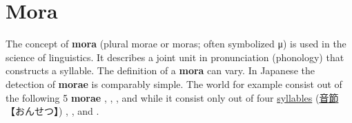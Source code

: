 \section{Mora}
\label{sec:Mora}
 
 

The concept of \textbf{mora} (plural morae or moras; often symbolized μ) is
used in the science of linguistics. It describes a joint unit in pronunciation
(phonology) that constructs a syllable. The definition of a \textbf{mora} can
vary.  In Japanese the detection of \textbf{morae} is comparably simple. The
world  for example consist out of the following 5
\textbf{morae} , , ,
 and  while it consist only out of four
\hyperref[sec:Syllable]{syllables} {(\hyperref[sec:Syllable]{音節}
【おんせつ】)} , ,
 and .

